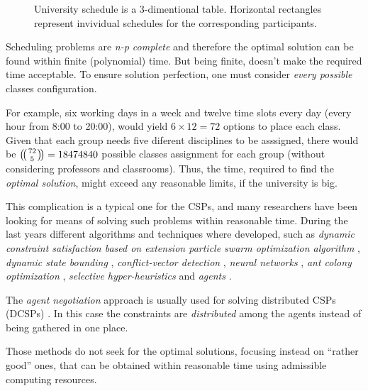 \begin{figure}
  
  \caption{University schedule is a 3-dimentional table. Horizontal rectangles
           represent invividual schedules for the corresponding participants.
          }
  \label{fig:ScheduleSpace}
\end{figure}


Scheduling problems are \emph{n-p complete} \cite{ULLMAN1975384}
and therefore the optimal solution can be found within finite (polynomial) time.
But being finite, doesn't make the required time acceptable.
To ensure solution perfection, one must consider \emph{every possible} classes
configuration.

For example, six working days in a week and twelve time slots every day
(every hour from 8:00 to 20:00), would yield $6 \times 12 = 72$ options
to place each class.
Given that each group needs five diferent disciplines to be asssigned,
there would be  $\multibinom{72}{5} = 18474840$ possible classes assignment for
each group (without considering professors and classrooms).
Thus, the time, required to find the \emph{optimal solution}, might exceed any
reasonable limits, if the university is big.

This complication is a typical one for the CSPs, and many researchers have
been looking for means of solving such problems within reasonable time.
During the last years different algorithms and techniques where developed,
such as
\emph{dynamic constraint satisfaction based on extension particle swarm
      optimization algorithm} \cite{CSPswarm},
\emph{dynamic state bounding} \cite{CSPdynStateBound},
\emph{conflict-vector detection} \cite{CSPtimetable},
\emph{neural networks} \cite{CSPneuro},
\emph{ant colony optimization} \cite{CSPcunningACO, CSPlimmemACO},
\emph{selective hyper-heuristics} \cite{CSPhypHeur}
and \emph{agents} \cite{CSPagent2013, CSPagent2014, DCSPagent1998}.


The \emph{agent negotiation} approach is usually used for solving distributed
CSPs (DCSPs) \cite{DCSPagent1998, DCSP2013, CSPagent2014}.
In this case the constraints are \emph{distributed} among the agents instead of
being gathered in one place.

\medskip

Those methods do not seek for the optimal solutions, focusing instead on
``rather good'' ones, that can be obtained within reasonable time using admissible
computing resources.

\medskip

